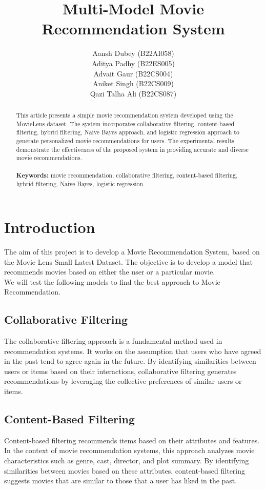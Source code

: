 \documentclass[a4paper]{article}
\title{Multi-Model Movie Recommendation System}
\author{
    Aansh Dubey (B22AI058) \\
    Aditya Padhy (B22ES005)\\
    Advait Gaur (B22CS004) \\
    Aniket Singh (B22CS009) \\
    Qazi Talha Ali (B22CS087) \\
}
\theoremstyle{plain}
\theoremstyle{definition}
\begin{document}
    \maketitle
    
    \begin{abstract}
        This article presents a simple movie recommendation system developed using the MovieLens dataset. The system incorporates collaborative filtering, content-based filtering, hybrid filtering, Naive Bayes approach, and logistic regression approach to generate personalized movie recommendations for users. The experimental results demonstrate the effectiveness of the proposed system in providing accurate and diverse movie recommendations.\\ \\
            
        \noindent\textbf{Keywords:} movie recommendation, collaborative filtering, content-based filtering, hybrid filtering, Naive Bayes, logistic regression
        \vspace{15cm}
    \end{abstract}

    \tableofcontents

\section{Introduction}
\label{sec:intro}
The aim of this project is to develop a Movie Recommendation System, based on the Movie Lens Small Latest Dataset. The objective is to develop a model that recommends movies based on either the user or a particular movie.\\
We will test the following models to find the best approach to Movie Recommendation.

\subsection*{Collaborative Filtering}

The collaborative filtering approach is a fundamental method used in recommendation systems. It works on the assumption that users who have agreed in the past tend to agree again in the future. By identifying similarities between users or items based on their interactions, collaborative filtering generates recommendations by leveraging the collective preferences of similar users or items.

\subsection*{Content-Based Filtering}
Content-based filtering recommends items based on their attributes and features. In the context of movie recommendation systems, this approach analyzes movie characteristics such as genre, cast, director, and plot summary. By identifying similarities between movies based on these attributes, content-based filtering suggests movies that are similar to those that a user has liked in the past.
\end{document}
